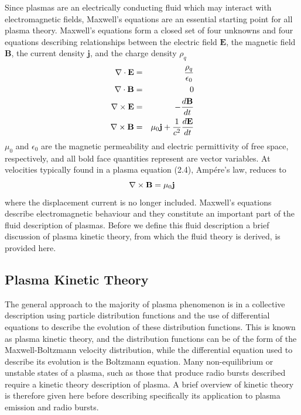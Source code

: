 Since plasmas are an electrically conducting fluid which may interact with electromagnetic fields, Maxwell's equations are an essential starting point for all plasma theory. Maxwell's equations form a closed set of four unknowns and four equations describing relationships between the electric field $\mathbf{E}$, the magnetic field $\mathbf{B}$, the current density $\mathbf{j}$, and the charge density $\rho_q$
\begin{eqnarray}
\nabla \cdot \mathbf{E} &=& \frac{\rho_q}{\epsilon_0} \\
\nabla \cdot \mathbf{B} &=& 0 \\
{\bf \nabla} \times{\mathbf{E}} &=& - \frac{d\mathbf{B}}{dt} \\
{\bf \nabla} \times{\mathbf{B}} &=& \mu_0 \mathbf{j} + \frac{1}{c^2}\frac{d\mathbf{E}}{dt} 
\end{eqnarray}
$\mu_0$ and $\epsilon_0$ are the magnetic permeability and electric permittivity of free space, respectively, and all bold face quantities represent are vector variables. At velocities typically found in a plasma equation (2.4), Amp\'{e}re's law, reduces to
\begin{equation}
{\bf \nabla} \times{\mathbf{B}} = \mu_0 \mathbf{j}
\label{eqn:amperes_law}
\end{equation}
where the displacement current is no longer included. Maxwell's equations describe electromagnetic behaviour and they constitute an important part of the fluid description of plasmas. Before we define this fluid description a brief discussion of plasma kinetic theory, from which the fluid theory is derived, is provided here.

\subsection{Plasma Kinetic Theory}\label{sec:11}

The general approach to the majority of plasma phenomenon is in a collective description using particle distribution functions and the use of differential equations to describe the evolution of these distribution functions. This is known as plasma kinetic theory, and the distribution functions can be of the form of the Maxwell-Boltzmann velocity distribution, while the differential equation used to describe its evolution is the Boltzmann equation. Many non-equilibrium or unstable states of a plasma, such as those that produce radio bursts described require a kinetic theory description of plasma. A brief overview of kinetic theory is therefore given here before describing specifically its application to plasma emission and radio bursts.


